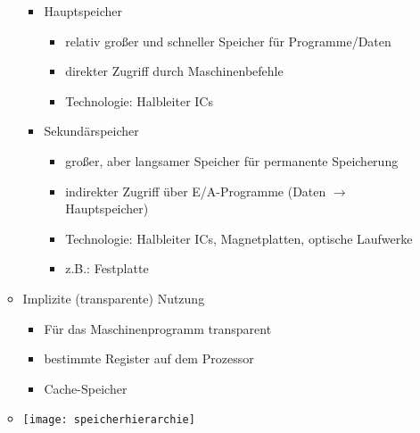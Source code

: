 \begin{itemize}
\begin{itemize}
\begin{itemize}
                        \item Hauptspeicher
                            \begin{itemize}
                                \item relativ großer und schneller Speicher für Programme/Daten 
                                \item direkter Zugriff durch Maschinenbefehle 
                                \item Technologie: Halbleiter ICs
                            \end{itemize}

                        \item Sekundärspeicher
                            \begin{itemize}
                                \item großer, aber langsamer Speicher für permanente Speicherung
                                \item indirekter Zugriff über E/A-Programme (Daten $\rightarrow$ Hauptspeicher)
                                \item Technologie: Halbleiter ICs, Magnetplatten, optische Laufwerke
                                \item z.B.: Festplatte
                            \end{itemize}
                    \end{itemize}

                \item Implizite (transparente) Nutzung 
                    \begin{itemize}
                        \item Für das Maschinenprogramm transparent
                        \item bestimmte Register auf dem Prozessor 
                        \item Cache-Speicher
                    \end{itemize}
                
                \item[] \texttt{[image: speicherhierarchie]}
                

\end{itemize}
\end{itemize}
